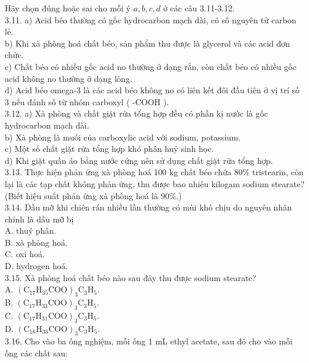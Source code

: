 \documentclass[10pt]{article}
\begin{document}
Hãy chọn đúng hoặc sai cho mỗi ý $a, b, c, d$ ở các câu 3.11-3.12.\\
3.11. a) Acid béo thường có gốc hydrocarbon mạch dài, có số nguyên tử carbon lẻ.\\
b) Khi xà phòng hoá chất béo, sản phẩm thu được là glycerol và các acid đơn chức.\\
c) Chất béo có nhiều gốc acid no thường ở dạng rắn, còn chất béo có nhiều gốc acid không no thường ở dạng lỏng.\\
d) Acid béo omega-3 là các acid béo không no có liên kết đôi đầu tiên ở vị trí số 3 nếu đánh số từ nhóm carboxyl ( -COOH ).\\
3.12. a) Xà phòng và chất giặt rửa tổng hợp đều có phần kị nước là gốc hydrocarbon mạch dài.\\
b) Xà phòng là muối của carboxylic acid với sodium, potassium.\\
c) Một số chất giặt rửa tổng hợp khó phân huỷ sinh học.\\
d) Khi giặt quần áo bằng nước cứng nên sử dụng chất giặt rửa tổng hợp.\\
3.13. Thực hiện phản ứng xà phòng hoá 100 kg chất béo chứa $80 \%$ tristearin, còn lại là các tạp chất không phản ứng, thu được bao nhiêu kilogam sodium stearate? (Biết hiệu suất phản ứng xà phòng hoá là $90 \%$.)\\
3.14. Dầu mỡ khi chiên rán nhiều lần thường có mùi khó chịu do nguyên nhân chính là dầu mỡ bị\\
A. thuý phân.\\
B. xà phòng hoá.\\
C. oxi hoá.\\
D. hydrogen hoá.\\
3.15. Xà phòng hoá chất béo nào sau đây thu được sodium stearate?\\
A. $\left(\mathrm{C}_{17} \mathrm{H}_{35} \mathrm{COO}\right)_{3} \mathrm{C}_{3} \mathrm{H}_{5}$.\\
B. $\left(\mathrm{C}_{17} \mathrm{H}_{33} \mathrm{COO}\right)_{3} \mathrm{C}_{3} \mathrm{H}_{5}$.\\
C. $\left(\mathrm{C}_{17} \mathrm{H}_{31} \mathrm{COO}\right)_{3} \mathrm{C}_{3} \mathrm{H}_{5}$.\\
D. $\left(\mathrm{C}_{16} \mathrm{H}_{33} \mathrm{COO}\right)_{3} \mathrm{C}_{3} \mathrm{H}_{5}$.\\
3.16. Cho vào ba ống nghiệm, mỗi ống 1 mL ethyl acetate, sau đó cho vào mỗi ống các chất sau:
\end{document}
